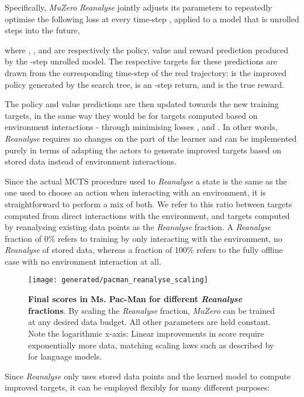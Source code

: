 \documentclass{article}
\newcommand{\muzero}{\emph{MuZero}}
\newcommand{\reanalyse}{\emph{Reanalyse}}
\begin{document}
Specifically, \muzero{} \reanalyse{} jointly adjusts its parameters  to repeatedly optimise the following loss at every time-step , applied to a model that is unrolled  steps into the future,


where , , and  are respectively the policy, value and reward prediction produced by the -step unrolled model. The respective targets for these predictions are drawn from the corresponding time-step  of the real trajectory:  is the improved policy generated by the search tree,  is an -step return, and  is the true reward.

The policy and value predictions are then updated towards the new training targets, in the same way they would be for targets computed based on environment interactions - through minimising losses ,  and . In other words, \reanalyse{} requires no changes on the part of the learner and can be implemented purely in terms of adapting the actors to generate improved targets based on stored data instead of environment interactions.


Since the actual MCTS procedure used to \reanalyse{} a state is the same as the one used to choose an action when interacting with an environment, it is straightforward to perform a mix of both. We refer to this ratio between targets computed from direct interactions with the environment, and targets computed by reanalysing existing data points as the \reanalyse{} fraction. A \reanalyse{} fraction of 0\% refers to training by only interacting with the environment, no \reanalyse{} of stored data, whereas a fraction of 100\% refers to the fully offline case with no environment interaction at all.

\begin{figure}[t]
\texttt{[image: generated/pacman\_reanalyse\_scaling]}
\vspace*{-7mm}
\caption[]{
\label{fig:reanalyse-scaling}
\textbf{Final scores in Ms. Pac-Man for different \reanalyse{} fractions}. By scaling the \reanalyse{} fraction, \muzero{} can be trained at any desired data budget. All other parameters are held constant. Note the logarithmic x-axis: Linear improvements in score require exponentially more data, matching scaling laws such as described by \cite{kaplan2020scaling} for language models.
}
\end{figure}

Since \reanalyse{} only uses stored data points and the learned model to compute improved targets, it can be employed flexibly for many different purposes:
\end{document}
